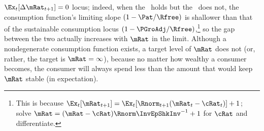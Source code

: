 \documentclass[BufferStockTheory]{subfiles}
\begin{document}
$\Ex_{t}[\Delta \mRat_{t+1}]=0$ locus; indeed, when the \RIC~holds but
the \GIC~does not, the consumption function's limiting slope
$(1-\Pat/\Rfree)$ is shallower than that of the sustainable consumption
locus $(1-\PGroAdj/\Rfree)$,\footnote{This is because
  $\Ex_{t}[\mRat_{t+1}]=\Ex_{t}[\Rnorm_{t+1}(\mRat_{t}-\cRat_{t})]+1$; solve $\mRat = (\mRat - \cRat)\Rnorm \InvEpShkInv^{-1}+1$ for $\cRat$ and differentiate.}
so the gap between the two actually increases with $\mRat$ in the
limit.  Although a nondegenerate consumption function
exists, a target level of $\mRat$ does not (or, rather, the
target is $\mRat=\infty$), because no matter how wealthy a consumer
becomes, the consumer will always spend less than the amount that
would keep $\mRat$ stable (in expectation).

\renewcommand{\figFile}{FVACnotGIC}
\hypertarget{\figFile}{}


\begin{comment}
  The foregoing has some connection with the theoretical results in
  Szeidl~\citeyearpar{szeidlInvariant}, who shows that the condition we
  call the \GIC~guarantees that $\mRat$ will have an asymptotically
  bounded mean.  He also shows that under these circumstances $\mRat$
  satisfies conditions he proves to be necessary for the existence of a
  stable invariant distribution.  Furthermore, $\aRat$, $\bRat$, and $\cRat$
  are also shown to have stable invariant distributions and asymptotically
  bounded means.  We make use of these results below.
\end{comment}

\begin{comment} %
  A final point worth reemphasizing is that neither the Return
  Impatience Condition nor the Finite Human Wealth Condition was
  required for the contraction mapping proof.  Both these conditions are
  necessary for a nondegenerate solution to exist in the unconstrained
  perfect foresight case.  This is noteworthy because in some models and
  in many economists' intuition, the introduction of uncertainty reduces
  the space of parameter values for which a unique solution exists;
  here, precisely the opposite occurs.  Indeed, many of the
  parameterizations newly eligible for solution are quite plausible, so
  this observation is not merely a curiosum but of real practical
  value.\footnote{An easy example of a case where the perfect foresight
    model has no solution is where $\Rfree >1$, $\DiscFac = 1/\Rfree$
    and $\PGro > \Rfree$.}
\end{comment}
\end{document}
